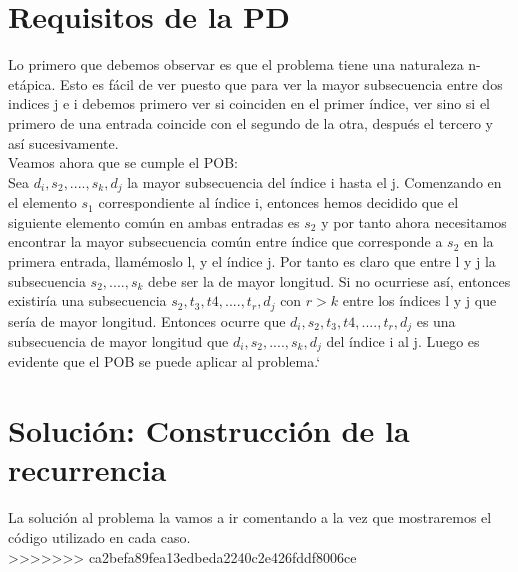 \documentclass[10pt,a4paper]{article}
\begin{document}
\section{Requisitos de la PD}
Lo primero que debemos observar es que el problema tiene una naturaleza n-etápica. Esto es fácil de ver puesto que para ver la mayor subsecuencia entre dos indices j e i debemos primero ver si coinciden en el primer índice, ver sino si el primero de una entrada coincide con el segundo de la otra, después el tercero y así sucesivamente.
\\
Veamos ahora que se cumple el POB:	\\
Sea $ d_i, s_2,...., s_k, d_j$ la mayor subsecuencia del índice i hasta el j.
Comenzando en el elemento $s_1$ correspondiente al índice i, entonces hemos decidido que el siguiente elemento común en ambas entradas es $s_2$ y por tanto ahora necesitamos encontrar la mayor subsecuencia común entre índice que corresponde a $s_2$ en la primera entrada, llamémoslo l, y el índice j. Por tanto es claro que entre l y j la subsecuencia $s_2,...., s_k$ debe ser la de mayor longitud. Si no ocurriese así, entonces existiría una subsecuencia $s_2, t_3, t4, ...., t_r, d_j$ con $r>k$ entre los índices l y j que sería de mayor longitud. Entonces ocurre que $d_i, s_2, t_3, t4, ...., t_r, d_j$ es una subsecuencia de mayor longitud que $ d_i, s_2,...., s_k, d_j$ del índice i al j. Luego es evidente que el POB se puede aplicar al problema.`

\section{Solución: Construcción de la recurrencia}
La solución al problema la vamos a ir comentando a la vez que mostraremos el código utilizado en cada caso.
\\

>>>>>>> ca2befa89fea13edbeda2240c2e426fddf8006ce
\end{document}
